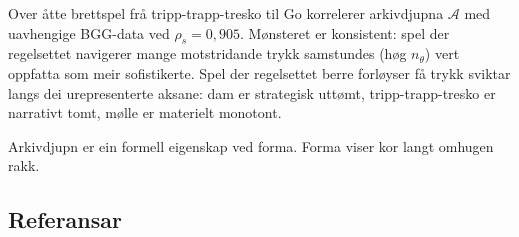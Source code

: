 \documentclass[10pt,twocolumn]{article}
\begin{document}
Over \aa tte brettspel fr\aa{} tripp-trapp-tresko til Go korrelerer arkivdjupna $\mathcal{A}$ med uavhengige BGG-data ved $\rho_s = 0{,}905$. M\o nsteret er konsistent: spel der regelsettet navigerer mange motstridande trykk samstundes (h\o g $n_\theta$) vert oppfatta som meir sofistikerte. Spel der regelsettet berre forl\o yser f\aa{} trykk sviktar langs dei urepresenterte aksane: dam er strategisk utt\o mt, tripp-trapp-tresko er narrativt tomt, m\o lle er materielt monotont.

Arkivdjupn er ein formell eigenskap ved forma. Forma viser kor langt omhugen rakk.


\small
\subsection*{Referansar}
\begingroup\renewcommand{\section}[2]{}
\end{document}
